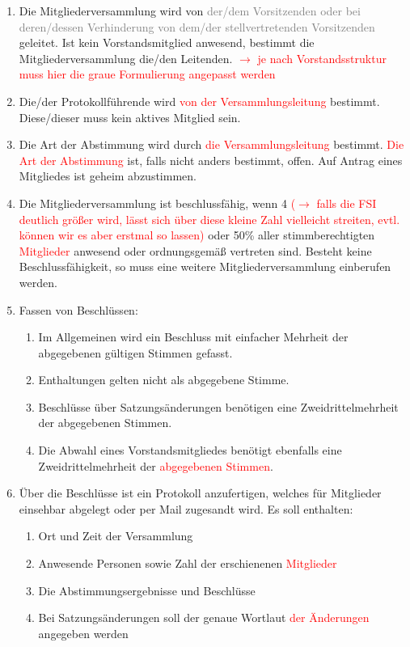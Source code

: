 \documentclass[a4paper,12pt]{article}
\newcommand{\red}[1]{\textcolor{red}{#1}}
\newcommand{\gray}[1]{\textcolor{gray}{#1}}
\begin{document}
\begin{enumerate}
    	\item
		Die Mitgliederversammlung wird von \gray{der/dem Vorsitzenden oder bei
		deren/dessen Verhinderung von dem/der stellvertretenden
		Vorsitzenden} geleitet. Ist kein Vorstandsmitglied anwesend,
		bestimmt die Mitgliederversammlung die/den Leitenden.
		\red{$\rightarrow$ je nach Vorstandsstruktur muss hier die graue Formulierung angepasst werden}
    	\item
		Die/der Protokollführende wird \red{von der Versammlungsleitung} bestimmt.
		Diese/dieser muss kein aktives Mitglied sein.
    	\item
		Die Art der Abstimmung wird durch \red{die Versammlungsleitung} bestimmt. \red{Die Art der Abstimmung}
		ist, falls nicht anders bestimmt, offen. Auf Antrag eines
		Mitgliedes ist geheim abzustimmen.
    	\item
		Die Mitgliederversammlung ist beschlussfähig, wenn 4 \red{($\rightarrow$ falls die FSI deutlich größer wird, lässt sich über diese kleine Zahl vielleicht streiten, evtl. können wir es aber erstmal so lassen)} oder 50\%
		aller stimmberechtigten \red{Mitglieder} anwesend oder
		ordnungsgemäß vertreten sind. Besteht keine Beschlussfähigkeit,
		so muss eine weitere Mitgliederversammlung einberufen werden.
    	\item
		Fassen von Beschlüssen:
    		\begin{enumerate}[label=(\roman*)]
			\item
				Im Allgemeinen wird ein Beschluss mit einfacher
				Mehrheit der abgegebenen gültigen Stimmen
				gefasst.
			\item
				Enthaltungen gelten nicht als abgegebene Stimme.
			\item
				Beschlüsse über Satzungsänderungen benötigen
				eine Zweidrittelmehrheit der abgegebenen
				Stimmen.
			\item
				Die Abwahl eines Vorstandsmitgliedes benötigt
				ebenfalls eine Zweidrittelmehrheit der
				\red{abgegebenen Stimmen}.
		\end{enumerate}
    	\item
		Über die Beschlüsse ist ein Protokoll anzufertigen, welches für
		Mitglieder einsehbar abgelegt oder per Mail zugesandt wird.
		Es soll enthalten:
    		\begin{enumerate}[label=(\roman*)]
        		\item
				Ort und Zeit der Versammlung
        		\item
				Anwesende Personen sowie Zahl der erschienenen
				\red{Mitglieder}
        		\item
				Die Abstimmungsergebnisse und Beschlüsse
        		\item
				Bei Satzungsänderungen soll der genaue Wortlaut
				\red{der Änderungen} angegeben werden
    		\end{enumerate}
\end{enumerate}
\end{document}
